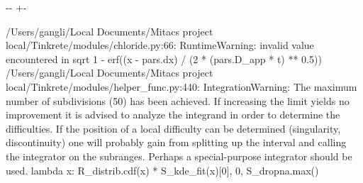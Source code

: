 \documentclass[letterpaper,10pt,english]{sphinxmanual}
\newlength\nbsphinxcodecellspacing
\begin{document}
{
\begin{sphinxVerbatim}[commandchars=\\\{\}]
\llap{\color{nbsphinxin}[19]:\,\hspace{\fboxrule}\hspace{\fboxsep}}
  
  
    

\end{sphinxVerbatim}
}

{

\kern-\sphinxverbatimsmallskipamount\kern-\baselineskip
\kern+\FrameHeightAdjust\kern-\fboxrule
\vspace{\nbsphinxcodecellspacing}

\begin{sphinxVerbatim}[commandchars=\\\{\}]
/Users/gangli/Local Documents/Mitacs project local/Tinkrete/modules/chloride.py:66: RuntimeWarning: invalid value encountered in sqrt
  1 - erf((x - pars.dx) / (2 * (pars.D\_app * t) ** 0.5))
/Users/gangli/Local Documents/Mitacs project local/Tinkrete/modules/helper\_func.py:440: IntegrationWarning: The maximum number of subdivisions (50) has been achieved.
  If increasing the limit yields no improvement it is advised to analyze
  the integrand in order to determine the difficulties.  If the position of a
  local difficulty can be determined (singularity, discontinuity) one will
  probably gain from splitting up the interval and calling the integrator
  on the subranges.  Perhaps a special-purpose integrator should be used.
  lambda x: R\_distrib.cdf(x) * S\_kde\_fit(x)[0], 0, S\_dropna.max()
\end{sphinxVerbatim}
}
\end{document}
